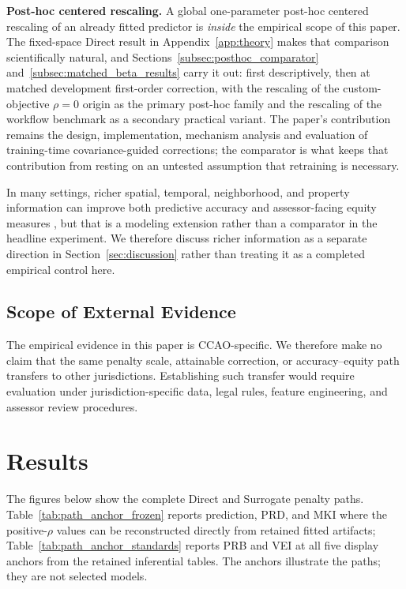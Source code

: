\documentclass[10pt]{article}
\theoremstyle{definition}
\newcommand{\1}{\mathbf{1}}
\begin{document}
\textbf{Post-hoc centered rescaling.} A global one-parameter post-hoc centered rescaling of an already fitted predictor is \emph{inside} the empirical scope of this paper. The fixed-space Direct result in Appendix~\ref{app:theory} makes that comparison scientifically natural, and Sections~\ref{subsec:posthoc_comparator} and~\ref{subsec:matched_beta_results} carry it out: first descriptively, then at matched development first-order correction, with the rescaling of the custom-objective $\rho=0$ origin as the primary post-hoc family and the rescaling of the workflow benchmark as a secondary practical variant. The paper's contribution remains the design, implementation, mechanism analysis and evaluation of training-time covariance-guided corrections; the comparator is what keeps that contribution from resting on an untested assumption that retraining is necessary.


In many settings, richer spatial, temporal, neighborhood, and property information can improve both predictive accuracy and assessor-facing equity measures \cite{SmithEtAl2026}, but that is a modeling extension rather than a comparator in the headline experiment. We therefore discuss richer information as a separate direction in Section~\ref{sec:discussion} rather than treating it as a completed empirical control here.


\subsection{Scope of External Evidence}
\label{subsec:external_scope}

The empirical evidence in this paper is CCAO-specific. We therefore make no claim
that the same penalty scale, attainable correction, or accuracy--equity path transfers
to other jurisdictions. Establishing such transfer would require evaluation under
jurisdiction-specific data, legal rules, feature engineering, and assessor review
procedures.


\section{Results}
\label{sec:results}

The figures below show the complete Direct and Surrogate penalty paths. Table~\ref{tab:path_anchor_frozen} reports prediction, PRD, and MKI where the positive-$\rho$ values can be reconstructed directly from retained fitted artifacts; Table~\ref{tab:path_anchor_standards} reports PRB and VEI at all five display anchors from the retained inferential tables. The anchors illustrate the paths; they are not selected models.
\end{document}
